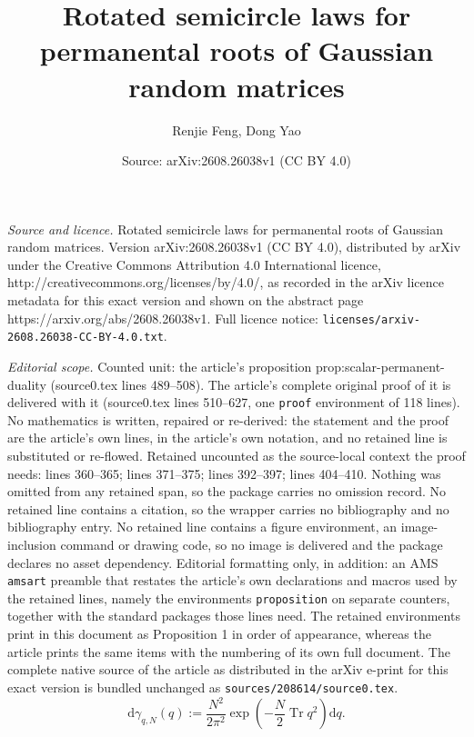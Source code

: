 \documentclass[10pt,a4paper]{amsart}
\title{Rotated semicircle laws for permanental roots of Gaussian random matrices}
\author{Renjie Feng, Dong Yao}
\date{Source: arXiv:2608.26038v1 (CC BY 4.0)}
\DeclareMathOperator{\Tr}{Tr}
\newcommand{\dd}{\mathrm d}
\begin{document}
\maketitle

\noindent\emph{Source and licence.} Rotated semicircle laws for permanental roots of Gaussian random matrices. Version arXiv:2608.26038v1 (CC BY 4.0), distributed by arXiv under the Creative Commons Attribution 4.0 International licence, http://creativecommons.org/licenses/by/4.0/, as recorded in the arXiv licence metadata for this exact version and shown on the abstract page https://arxiv.org/abs/2608.26038v1. Full licence notice: \texttt{licenses/arxiv-2608.26038-CC-BY-4.0.txt}.\par\smallskip

\noindent\textit{Editorial scope.} Counted unit: the article's proposition prop:scalar-permanent-duality (source0.tex lines 489--508). The article's complete original proof of it is delivered with it (source0.tex lines 510--627, one \texttt{proof} environment of 118 lines). No mathematics is written, repaired or re-derived: the statement and the proof are the article's own lines, in the article's own notation, and no retained line is substituted or re-flowed.  Retained uncounted as the source-local context the proof needs: lines 360--365; lines 371--375; lines 392--397; lines 404--410.  Nothing was omitted from any retained span, so the package carries no omission record.  No retained line contains a citation, so the wrapper carries no bibliography and no bibliography entry.  No retained line contains a figure environment, an image-inclusion command or drawing code, so no image is delivered and the package declares no asset dependency.  Editorial formatting only, in addition: an AMS \texttt{amsart} preamble that restates the article's own declarations and macros used by the retained lines, namely the environments \texttt{proposition} on separate counters, together with the standard packages those lines need.  The retained environments print in this document as Proposition 1 in order of appearance, whereas the article prints the same items with the numbering of its own full document.  The complete native source of the article as distributed in the arXiv e-print for this exact version is bundled unchanged as \texttt{sources/208614/source0.tex}.
\begin{equation}\label{eq:aux-q-law}
  \dd\gamma_{q,N}(q)
  :=
  \frac{N^2}{2\pi^2}
  \exp\!\left(-\frac N2\Tr q^2\right)\dd q.
\end{equation}
\end{document}
